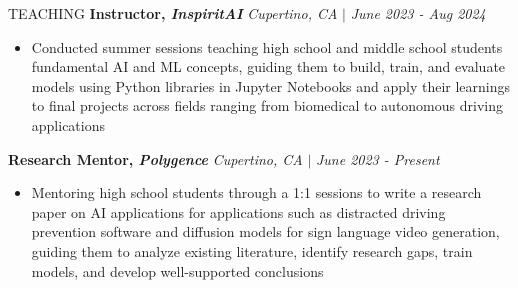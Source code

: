 \documentclass{resume} %
\begin{document}
\begin{rSection}{TEACHING}
\textbf{Instructor, \textit{InspiritAI}} \hfill {\it Cupertino, CA} \(|\) {\it June 2023 - Aug 2024}
\begin{itemize}
\itemsep -0.5em \vspace{-0.5em}
\item Conducted summer sessions teaching high school and middle school students fundamental AI and ML concepts, guiding them to build, train, and evaluate models using Python libraries in Jupyter Notebooks and apply their learnings to final projects across fields ranging from biomedical to autonomous driving applications
\end{itemize}
\textbf{Research Mentor, \textit{Polygence}} \hfill {\it Cupertino, CA} \(|\) {\it June 2023 - Present}
\begin{itemize}
    \itemsep -0.5em \vspace{-0.5em}
    \item Mentoring high school students through a 1:1 sessions to write a research paper on AI applications for applications such as distracted driving prevention software and diffusion models for sign language video generation, guiding them to analyze existing literature, identify research gaps, train models, and develop well-supported conclusions
\end{itemize}
\end{rSection}
\end{document}
